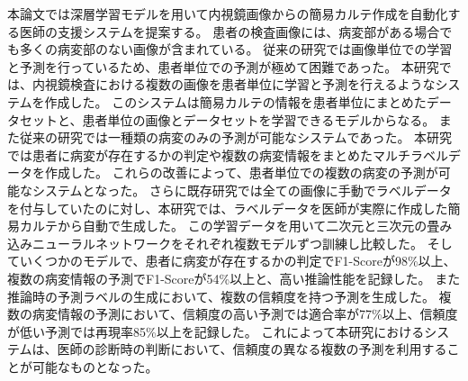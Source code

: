 本論文では深層学習モデルを用いて内視鏡画像からの簡易カルテ作成を自動化する医師の支援システムを提案する。
患者の検査画像には、病変部がある場合でも多くの病変部のない画像が含まれている。
従来の研究では画像単位での学習と予測を行っているため、患者単位での予測が極めて困難であった。
本研究では、内視鏡検査における複数の画像を患者単位に学習と予測を行えるようなシステムを作成した。
このシステムは簡易カルテの情報を患者単位にまとめたデータセットと、患者単位の画像とデータセットを学習できるモデルからなる。
また従来の研究では一種類の病変のみの予測が可能なシステムであった。
本研究では患者に病変が存在するかの判定や複数の病変情報をまとめたマルチラベルデータを作成した。
これらの改善によって、患者単位での複数の病変の予測が可能なシステムとなった。
さらに既存研究では全ての画像に手動でラベルデータを付与していたのに対し、本研究では、ラベルデータを医師が実際に作成した簡易カルテから自動で生成した。
この学習データを用いて二次元と三次元の畳み込みニューラルネットワークをそれぞれ複数モデルずつ訓練し比較した。
そしていくつかのモデルで、患者に病変が存在するかの判定でF1-Scoreが98\%以上、複数の病変情報の予測でF1-Scoreが54\%以上と、高い推論性能を記録した。
また推論時の予測ラベルの生成において、複数の信頼度を持つ予測を生成した。
複数の病変情報の予測において、信頼度の高い予測では適合率が77\%以上、信頼度が低い予測では再現率85\%以上を記録した。
これによって本研究におけるシステムは、医師の診断時の判断において、信頼度の異なる複数の予測を利用することが可能なものとなった。
